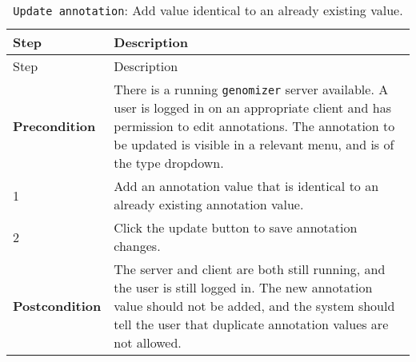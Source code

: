 \begin{longtable}[c]{@{}ll@{}}
\caption{\texttt{Update\ annotation}: Add value identical to an already
existing value.}\tabularnewline
\toprule
\begin{minipage}[b]{0.31\columnwidth}\raggedright\strut
Step
\strut\end{minipage} &
\begin{minipage}[b]{0.63\columnwidth}\raggedright\strut
Description
\strut\end{minipage}\tabularnewline
\midrule
\endfirsthead
\toprule
\begin{minipage}[b]{0.31\columnwidth}\raggedright\strut
Step
\strut\end{minipage} &
\begin{minipage}[b]{0.63\columnwidth}\raggedright\strut
Description
\strut\end{minipage}\tabularnewline
\midrule
\endhead
\begin{minipage}[t]{0.31\columnwidth}\raggedright\strut
\textbf{Precondition}
\strut\end{minipage} &
\begin{minipage}[t]{0.63\columnwidth}\raggedright\strut
There is a running \texttt{genomizer} server available. A user is logged
in on an appropriate client and has permission to edit annotations. The
annotation to be updated is visible in a relevant menu, and is of the
type dropdown.
\strut\end{minipage}\tabularnewline
\begin{minipage}[t]{0.31\columnwidth}\raggedright\strut
1
\strut\end{minipage} &
\begin{minipage}[t]{0.63\columnwidth}\raggedright\strut
Add an annotation value that is identical to an already existing
annotation value.
\strut\end{minipage}\tabularnewline
\begin{minipage}[t]{0.31\columnwidth}\raggedright\strut
2
\strut\end{minipage} &
\begin{minipage}[t]{0.63\columnwidth}\raggedright\strut
Click the update button to save annotation changes.
\strut\end{minipage}\tabularnewline
\begin{minipage}[t]{0.31\columnwidth}\raggedright\strut
\textbf{Postcondition}
\strut\end{minipage} &
\begin{minipage}[t]{0.63\columnwidth}\raggedright\strut
The server and client are both still running, and the user is still
logged in. The new annotation value should not be added, and the system
should tell the user that duplicate annotation values are not allowed.
\strut\end{minipage}\tabularnewline
\bottomrule
\end{longtable}

